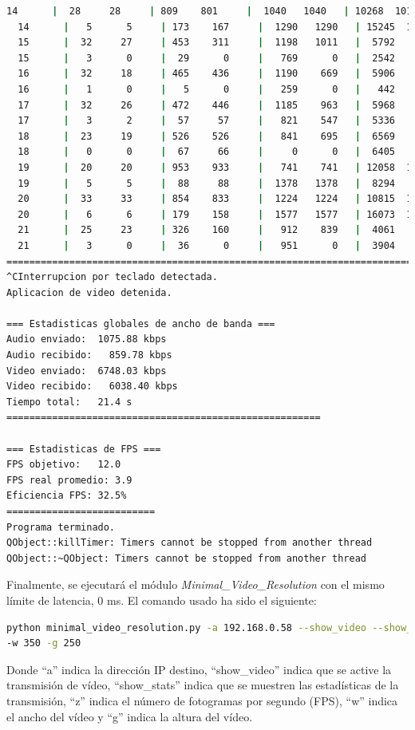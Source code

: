 \begin{lstlisting}[language=bash,basicstyle=\ttfamily\scriptsize]
  14      |  28     28     | 809    801     |  1040   1040   | 10268  10168   |  29     73
  14      |   5      5     | 173    167     |  1290   1290   | 15245  14698   |  39     72
  15      |  32     27     | 453    311     |  1198   1011   |  5792   3979   |  30     66
  15      |   3      0     |  29      0     |   769      0   |  2542      0   |  23     66
  16      |  32     18     | 465    436     |  1190    669   |  5906   5538   |  28     57
  16      |   1      0     |   5      0     |   259      0   |   442      0   |   7     59
  17      |  32     26     | 472    446     |  1185    963   |  5968   5642   |  29     75
  17      |   3      2     |  57     57     |   821    547   |  5336   5318   |  41     75
  18      |  23     19     | 526    526     |   841    695   |  6569   6572   |  20     81
  18      |   0      0     |  67     66     |     0      0   |  6405   6291   |   8     82
  19      |  20     20     | 953    933     |   741    741   | 12058  11807   |  16     77
  19      |   5      5     |  88     88     |  1378   1378   |  8294   8294   |  42     75
  20      |  33     33     | 854    833     |  1224   1224   | 10815  10549   |  33     72
  20      |   6      6     | 179    158     |  1577   1577   | 16073  14185   |  48     73
  21      |  25     23     | 326    160     |   912    839   |  4061   1993   |  37     75
  21      |   3      0     |  36      0     |   951      0   |  3904      0   |  29     76
============================================================================================
^CInterrupcion por teclado detectada.
Aplicacion de video detenida.

=== Estadisticas globales de ancho de banda ===
Audio enviado:	1075.88 kbps
Audio recibido:   859.78 kbps
Video enviado:	6748.03 kbps
Video recibido:   6038.40 kbps
Tiempo total: 	21.4 s
=======================================================

=== Estadisticas de FPS ===
FPS objetivo: 	12.0
FPS real promedio: 3.9
Eficiencia FPS:	32.5%
==========================
Programa terminado.
QObject::killTimer: Timers cannot be stopped from another thread
QObject::~QObject: Timers cannot be stopped from another thread
\end{lstlisting}

\newpage

Finalmente, se ejecutará el módulo \textit{Minimal\_Video\_Resolution} con el mismo límite de latencia, 0 ms. El comando usado ha sido el siguiente:

\begin{lstlisting}[language=bash,basicstyle=\ttfamily\scriptsize]
python minimal_video_resolution.py -a 192.168.0.58 --show_video --show_stats -z 12 \\
-w 350 -g 250
\end{lstlisting}
Donde ``a'' indica la dirección IP destino, ``show\_video'' indica que se active la transmisión de vídeo, ``show\_stats'' indica que se muestren las estadísticas de la transmisión, ``z'' indica el número de fotogramas por segundo (FPS), ``w'' indica el ancho del vídeo y ``g'' indica la altura del vídeo.
\vspace{\baselineskip}


